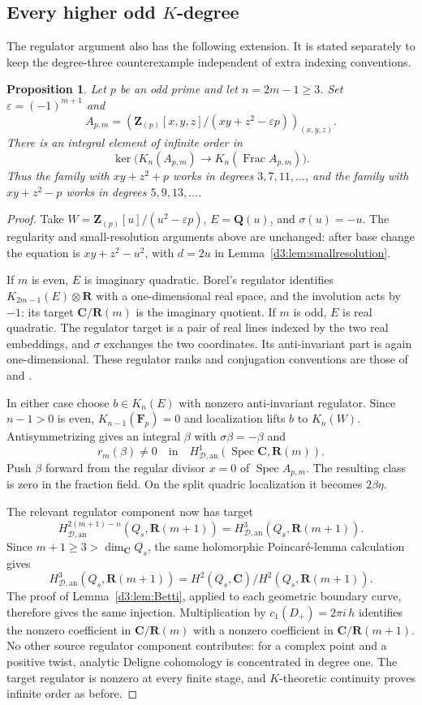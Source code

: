 \documentclass[11pt,a4paper]{amsart}
\numberwithin{equation}{section}
\newtheorem{proposition}[theorem]{Proposition}
\theoremstyle{definition}
\theoremstyle{remark}
\newcommand{\Q}{\mathbf Q}
\newcommand{\Z}{\mathbf Z}
\newcommand{\R}{\mathbf R}
\newcommand{\C}{\mathbf C}
\newcommand{\F}{\mathbf F}
\newcommand{\Spec}{\operatorname{Spec}}
\newcommand{\Frac}{\operatorname{Frac}}
\newcommand{\HD}{H_{\mathcal D,\mathrm{an}}}
\begin{document}
\subsection{Every higher odd $K$-degree}

The regulator argument also has the following extension. It is stated separately to keep the degree-three counterexample independent of extra indexing conventions.

\begin{proposition}\label{d3:prop:odddegrees}
Let $p$ be an odd prime and let $n=2m-1\geq3$. Set $\varepsilon=(-1)^{m+1}$ and
\[
A_{p,m}=\left(\Z_{(p)}[x,y,z]/(xy+z^2-\varepsilon p)\right)_{(x,y,z)}.
\]
There is an integral element of infinite order in
\[
\ker\bigl(K_n(A_{p,m})\longrightarrow K_n(\Frac A_{p,m})\bigr).
\]
Thus the family with $xy+z^2+p$ works in degrees $3,7,11,\ldots$, and the family with $xy+z^2-p$ works in degrees $5,9,13,\ldots$.
\end{proposition}
\begin{proof}
Take $W=\Z_{(p)}[u]/(u^2-\varepsilon p)$, $E=\Q(u)$, and $\sigma(u)=-u$. The regularity and small-resolution arguments above are unchanged: after base change the equation is $xy+z^2-u^2$, with $d=2u$ in Lemma~\ref{d3:lem:smallresolution}.

If $m$ is even, $E$ is imaginary quadratic. Borel's regulator identifies $K_{2m-1}(E)\otimes\R$ with a one-dimensional real space, and the involution acts by $-1$: its target $\C/\R(m)$ is the imaginary quotient. If $m$ is odd, $E$ is real quadratic. The regulator target is a pair of real lines indexed by the two real embeddings, and $\sigma$ exchanges the two coordinates. Its anti-invariant part is again one-dimensional. These regulator ranks and conjugation conventions are those of \cite[Proposition~12.2]{Borel} and \cite[Section~6]{BunkeTamme}.

In either case choose $b\in K_n(E)$ with nonzero anti-invariant regulator. Since $n-1>0$ is even, $K_{n-1}(\F_p)=0$ and localization lifts $b$ to $K_n(W)$. Antisymmetrizing gives an integral $\beta$ with $\sigma\beta=-\beta$ and
\[
r_m(\beta)\neq0\quad\text{in}\quad\HD^1(\Spec\C,\R(m)).
\]
Push $\beta$ forward from the regular divisor $x=0$ of $\Spec A_{p,m}$. The resulting class is zero in the fraction field. On the split quadric localization it becomes $2\beta\eta$.

The relevant regulator component now has target
\[
\HD^{2(m+1)-n}(Q_s,\R(m+1))
=\HD^3(Q_s,\R(m+1)).
\]
Since $m+1\geq3>\dim_{\C}Q_s$, the same holomorphic Poincar\'e-lemma calculation gives
\[
\HD^3(Q_s,\R(m+1))
=H^2(Q_s,\C)/H^2(Q_s,\R(m+1)).
\]
The proof of Lemma~\ref{d3:lem:Betti}, applied to each geometric boundary curve, therefore gives the same injection. Multiplication by $c_1(D_+)=2\pi i\,h$ identifies the nonzero coefficient in $\C/\R(m)$ with a nonzero coefficient in $\C/\R(m+1)$. No other source regulator component contributes: for a complex point and a positive twist, analytic Deligne cohomology is concentrated in degree one. The target regulator is nonzero at every finite stage, and $K$-theoretic continuity proves infinite order as before.
\end{proof}
\end{document}
